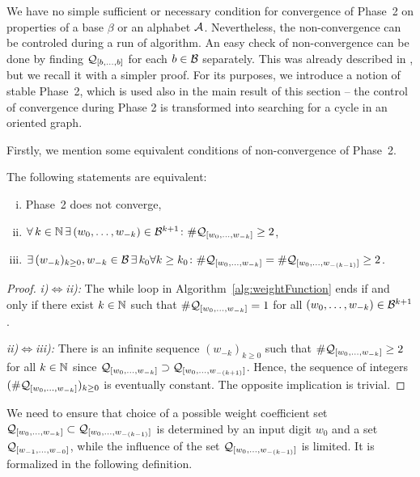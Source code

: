 \label{sec:convergencePhase2}

We have no simple sufficient or necessary condition for convergence of Phase~2 on properties of a base $\beta$ or an alphabet $\mathcal{A}$. Nevertheless, the non-convergence can be controled during a run of algorithm. An easy check of non-convergence can be done by finding $\mathcal{Q}_{[b, \dots, b]}$ for each $b\in\mathcal{B}$ separately. This was already described in \cite{vu}, but we recall it with a simpler proof. For its purposes, we introduce a notion of stable Phase~2, which is used also in the main result of this section -- the control of convergence during Phase 2 is transformed into searching for a cycle in an oriented graph.

Firstly, we mention some equivalent conditions of non-convergence of Phase~2. 
\begin{lem}
\label{lem:equivalentStatementsForNonConvergenePhaseTwo}
The following statements are equivalent:
\begin{enumerate}[i)]
	\item Phase~2 does not converge,
	\item $\forall \,k\in \mathbb{N} \,\exists\, (w_{0}, \dots, w_{-k})\in\mathcal{B}^{k+1} \colon \#\mathcal{Q}_{[w_{0}, \dots, w_{-k}]}\geq 2$,
	\item $\exists \,(w_{-k})_{k\geq 0}, w_{-k}\in\mathcal{B} \,\exists\, k_0\forall k\geq k_0 \colon \#\mathcal{Q}_{[w_{0}, \dots, w_{-k}]}=\#\mathcal{Q}_{[w_{0}, \dots, w_{-(k-1)}]}\geq 2$.
\end{enumerate}
\end{lem}
\begin{proof}
\textit{i)}$\iff$\textit{ii):} The while loop in Algorithm~\ref{alg:weightFunction} ends if and only if there exist $k\in\mathbb{N}$ such that $\#\mathcal{Q}_{[w_{0}, \dots, w_{-k}]}=1$ for all $(w_{0}, \dots, w_{-k})\in\mathcal{B}^{k+1}$.

\textit{ii)}$\iff$\textit{iii):} There is an infinite sequence $(w_{-k})_{k\geq 0}$ such that $\#\mathcal{Q}_{[w_{0}, \dots, w_{-k}]}\geq 2$ for all $k\in\mathbb{N}$ since $\mathcal{Q}_{[w_{0}, \dots, w_{-k}]}\supset\mathcal{Q}_{[w_{0}, \dots, w_{-(k+1)}]}$. Hence, the sequence of integers $(\#\mathcal{Q}_{[w_{0}, \dots, w_{-k}]})_{k\geq 0}$ is eventually constant. The opposite implication is trivial.
\end{proof}

We need to ensure that choice of a possible weight coefficient set $\mathcal{Q}_{[w_{0}, \dots, w_{-k}]}\subset \mathcal{Q}_{[w_{0}, \dots, w_{-(k-1)}]}$ is determined by an input digit $w_0$ and a set $\mathcal{Q}_{[w_{-1}, \dots, w_{-0}]}$, while the influence of the set $\mathcal{Q}_{[w_{0}, \dots, w_{-(k-1)}]}$ is limited. It is formalized in the following definition.

